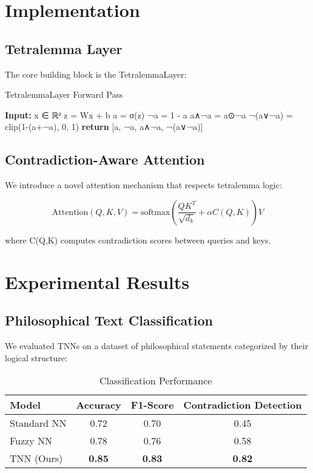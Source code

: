 \documentclass[10pt,journal,compsoc]{IEEEtran}
\begin{document}
\section{Implementation}
\subsection{Tetralemma Layer}
The core building block is the TetralemmaLayer:

\begin{algorithm}[H]
\caption{TetralemmaLayer Forward Pass}
\begin{algorithmic}[1]
\STATE \textbf{Input:} x ∈ ℝᵈ
\STATE z = Wx + b
\STATE a = σ(z)
\STATE ¬a = 1 - a
\STATE a∧¬a = a⊙¬a
\STATE ¬(a∨¬a) = clip(1-(a+¬a), 0, 1)
\STATE \textbf{return} [a, ¬a, a∧¬a, ¬(a∨¬a)]
\end{algorithmic}
\end{algorithm}

\subsection{Contradiction-Aware Attention}
We introduce a novel attention mechanism that respects tetralemma logic:

\begin{equation}
\text{Attention}(Q,K,V) = \text{softmax}\left(\frac{QK^T}{\sqrt{d_k}} + \alpha C(Q,K)\right)V
\end{equation}

where C(Q,K) computes contradiction scores between queries and keys.

\section{Experimental Results}
\subsection{Philosophical Text Classification}
We evaluated TNNs on a dataset of philosophical statements categorized by their logical structure:

\begin{table}[h]
\caption{Classification Performance}
\begin{center}
\begin{tabular}{|l|c|c|c|}
\hline
\textbf{Model} & \textbf{Accuracy} & \textbf{F1-Score} & \textbf{Contradiction Detection} \\
\hline
Standard NN & 0.72 & 0.70 & 0.45 \\
Fuzzy NN & 0.78 & 0.76 & 0.58 \\
TNN (Ours) & \textbf{0.85} & \textbf{0.83} & \textbf{0.82} \\
\hline
\end{tabular}
\end{center}
\end{table}
\end{document}
